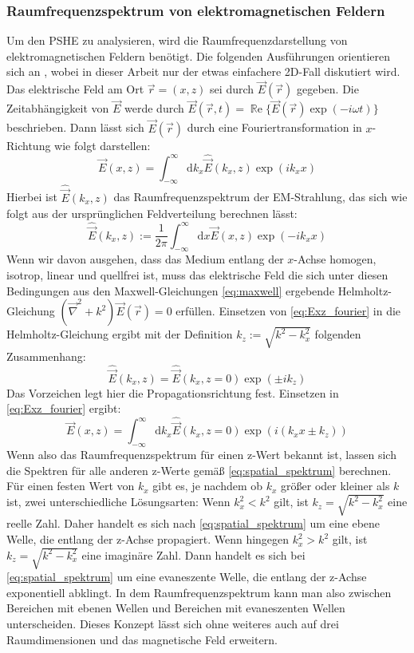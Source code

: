\documentclass[titlepage,  ngerman]{article}
\renewcommand{\Re}{\operatorname{\mathbb{R}e}}
\begin{document}
	\subsubsection{Raumfrequenzspektrum von elektromagnetischen Feldern}
	Um den PSHE zu analysieren, wird die Raumfrequenzdarstellung von elektromagnetischen Feldern benötigt. Die folgenden Ausführungen orientieren sich an \cite{Novotny.2012b}, wobei in dieser Arbeit nur der etwas einfachere 2D-Fall diskutiert wird.\\		
	Das elektrische Feld am Ort $\vec{r} = (x, z) $ sei durch $\vec{E}({\vec{r}})$ gegeben.
	Die Zeitabhängigkeit von $\vec{E}$ werde durch $\vec{E}({\vec{r}, t})=\Re\{\vec{E}({\vec{r}})\exp(-i\omega t)\}$ beschrieben. Dann lässt sich $\vec{E}({\vec{r}})$ durch eine Fouriertransformation in $x$-Richtung wie folgt darstellen:
	\begin{equation}
		\label{eq:Exz_fourier}
		\vec{E}(x,z) = \int_{-\infty}^{\infty}\mathrm{d}{k_x}\hat{\vec{E}}(k_x,z)\exp(ik_xx)				
	\end{equation}
	Hierbei ist $\hat{\vec{E}}(k_x,z)$ das Raumfrequenzspektrum der EM-Strahlung, das sich wie folgt aus der ursprünglichen Feldverteilung berechnen lässt:
	\begin{equation}
		\label{eq:EKxz_fourier}
		\hat{\vec{E}}(k_x,z) := \dfrac{1}{2\pi}\int_{-\infty}^{\infty}\mathrm{d}x\vec{E}(x,z)\exp(-ik_xx)
	\end{equation}
	Wenn wir davon ausgehen, dass das Medium entlang der $x$-Achse homogen, isotrop, linear und quellfrei ist, muss das elektrische Feld die sich unter diesen Bedingungen aus den Maxwell-Gleichungen \eqref{eq:maxwell} ergebende Helmholtz-Gleichung $(\vec{\nabla}^2+k^2)\vec{E}({\vec{r}}) = 0$ erfüllen. Einsetzen von \eqref{eq:Exz_fourier} in die Helmholtz-Gleichung ergibt mit der Definition $k_z := \sqrt{k^2-k_x^2}$ folgenden Zusammenhang:
	\begin{equation}
		\label{eq:spatial_spektrum}
		\hat{\vec{E}}(k_x,z) =\hat{\vec{E}}(k_x,z= 0) \exp(\pm ik_ z)
	\end{equation}
	Das Vorzeichen legt hier die Propagationsrichtung fest.
	Einsetzen in \eqref{eq:Exz_fourier} ergibt:
	\begin{equation}
		\label{eq:Espatial_spektrum}
		\vec{E}(x,z) = \int_{-\infty}^{\infty}\mathrm{d}{k_x}\hat{\vec{E}}(k_x,z= 0)\exp(i(k_xx\pm k_ z))
	\end{equation}
	Wenn also das Raumfrequenzspektrum für einen z-Wert bekannt ist, lassen sich die Spektren für alle anderen z-Werte gemäß \eqref{eq:spatial_spektrum} berechnen. Für einen festen Wert von $k_x$ gibt es, je nachdem ob $k_x$ größer oder kleiner als $k$ ist, zwei unterschiedliche Lösungsarten: Wenn $k_x^2 < k^2$ gilt, ist $k_z = \sqrt{k^2-k_x^2}$ eine reelle Zahl. Daher handelt es sich nach \eqref{eq:spatial_spektrum} um eine ebene Welle, die entlang der z-Achse propagiert.
	Wenn hingegen $k_x^2 > k^2$ gilt, ist $k_z = \sqrt{k^2-k_x^2}$ eine imaginäre Zahl. Dann handelt es sich bei \eqref{eq:spatial_spektrum} um eine evaneszente Welle, die entlang der z-Achse exponentiell abklingt. In dem Raumfrequenzspektrum kann man also zwischen Bereichen mit ebenen Wellen und Bereichen mit evaneszenten Wellen unterscheiden. Dieses Konzept lässt sich ohne weiteres auch auf drei Raumdimensionen und das magnetische Feld erweitern.
\end{document}

